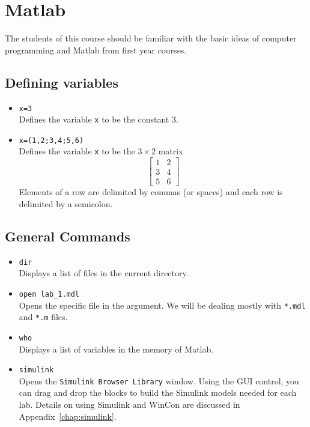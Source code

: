 \chapter{Matlab}\label{chap:MATLAB}

The students of this course should be familiar with the basic ideas of
computer programming and Matlab from first year courses.

\section{Defining variables}

\begin{itemize}
    \item \verb|x=3|\\
          Defines the variable \verb|x| to be the constant 3.
    \item \verb|x=(1,2;3,4;5,6)|\\
          Defines the variable \verb|x| to be the \(3 \times 2\) matrix
          \begin{equation*}
              \begin{bmatrix}1&2\\3&4\\5&6\end{bmatrix}
          \end{equation*}
          Elements of a row are delimited by commas (or spaces) and each row is
          delimited by a semicolon.
\end{itemize}

\section{General Commands}

\begin{itemize}
    \item \verb|dir|\\
          Displays a list of files in the current directory.
    \item  \verb|open lab_1.mdl|\\
          Opens the specific file in the argument. We will be dealing mostly with
          \verb|*.mdl| and \verb|*.m| files.
    \item \verb|who|\\
          Displays a list of variables in the memory of \textsf{Matlab}.
    \item \verb|simulink|\\
          Opens the \verb|Simulink Browser Library| window.  Using the GUI control, you
          can drag and drop the blocks to build the \textsf{Simulink} models needed for
          each lab.  Details on using \textsf{Simulink} and WinCon are discussed in
          Appendix~\ref{chap:simulink}.
\end{itemize}

